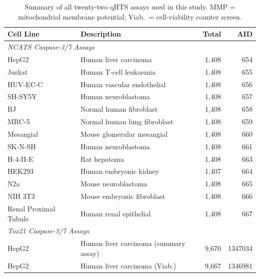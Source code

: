 \documentclass[letterpaper]{article}
\begin{document}
\begin{table}[t!]
\centering
\footnotesize
\caption{Summary of all twenty-two qHTS assays used in this study.
MMP = mitochondrial membrane potential; Viab.\ = cell-viability
counter screen.}
\label{tab:celllines}
\begin{tabular}{llrr}
\hline
\rule{0pt}{2.2ex}\textbf{Cell Line} & \textbf{Description} &
\textbf{Total} & \textbf{AID} \\
\hline
\multicolumn{4}{l}{\textit{NCATS Caspase-3/7 Assays}} \\
\hline
\rule{0pt}{2.2ex}HepG2                 & Human liver carcinoma         & 1{,}408 & 654 \\ \hline
Jurkat                & Human T-cell leukaemia        & 1{,}408 & 655 \\ \hline
HUV-EC-C              & Human vascular endothelial    & 1{,}408 & 656 \\ \hline
SH-SY5Y               & Human neuroblastoma           & 1{,}408 & 657 \\ \hline
BJ                    & Normal human fibroblast       & 1{,}408 & 658 \\ \hline
MRC-5                 & Normal human lung fibroblast  & 1{,}408 & 659 \\ \hline
Mesangial             & Mouse glomerular mesangial    & 1{,}408 & 660 \\ \hline
SK-N-SH               & Human neuroblastoma           & 1{,}408 & 661 \\ \hline
H-4-II-E              & Rat hepatoma                  & 1{,}408 & 663 \\ \hline
HEK293                & Human embryonic kidney        & 1{,}407 & 664 \\ \hline
N2a                   & Mouse neuroblastoma           & 1{,}408 & 665 \\ \hline
NIH 3T3               & Mouse embryonic fibroblast    & 1{,}408 & 666 \\ \hline
Renal Proximal Tubule & Human renal epithelial        & 1{,}408 & 667 \\[2pt]
\hline
\multicolumn{4}{l}{\textit{Tox21 Caspase-3/7 Assays}} \\
\hline
HepG2  & Human liver carcinoma (summary assay)        & 9{,}670 & 1347034 \\ \hline
HepG2  & Human liver carcinoma (Viab.)                 & 9{,}667 & 1346981 \\ \hline

\end{tabular}
\end{table}
\end{document}
